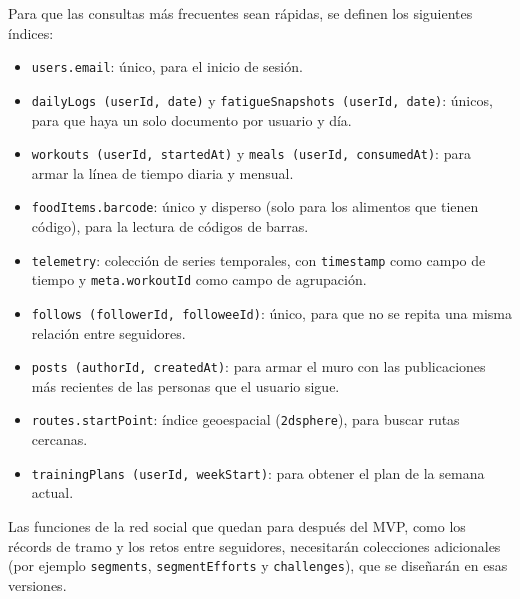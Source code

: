 Para que las consultas más frecuentes sean rápidas, se definen los siguientes índices:
\begin{itemize}
    \item \texttt{users.email}: único, para el inicio de sesión.
    \item \texttt{dailyLogs (userId, date)} y \texttt{fatigueSnapshots (userId, date)}: únicos, para que haya un solo documento por usuario y día.
    \item \texttt{workouts (userId, startedAt)} y \texttt{meals (userId, consumedAt)}: para armar la línea de tiempo diaria y mensual.
    \item \texttt{foodItems.barcode}: único y disperso (solo para los alimentos que tienen código), para la lectura de códigos de barras.
    \item \texttt{telemetry}: colección de series temporales, con \texttt{timestamp} como campo de tiempo y \texttt{meta.workoutId} como campo de agrupación.
    \item \texttt{follows (followerId, followeeId)}: único, para que no se repita una misma relación entre seguidores.
    
    \item \texttt{posts (authorId, createdAt)}: para armar el muro con las publicaciones más recientes de las personas que el usuario sigue.
    \item \texttt{routes.startPoint}: índice geoespacial (\texttt{2dsphere}), para buscar rutas cercanas.
    \item \texttt{trainingPlans (userId, weekStart)}: para obtener el plan de la semana actual.
\end{itemize}

Las funciones de la red social que quedan para después del MVP, como los récords de tramo y los retos entre seguidores, necesitarán colecciones adicionales (por ejemplo \texttt{segments}, \texttt{segmentEfforts} y \texttt{challenges}), que se diseñarán en esas versiones.

